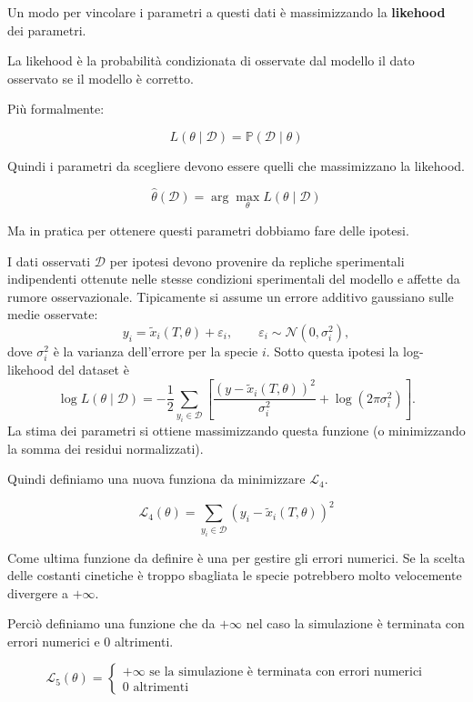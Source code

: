 Un modo per vincolare i parametri a questi dati è massimizzando la \textbf{likehood} dei parametri.

La likehood è la probabilità condizionata di osservate dal modello
il dato osservato se il modello è corretto.

Più formalmente:

\begin{equation}
    L(\theta \mid \mathcal{D}) = \mathbb{P}(\mathcal{D} \mid \theta)
\end{equation}

Quindi i parametri da scegliere devono essere quelli che massimizzano la likehood.

\begin{equation}
    \hat{\theta}(\mathcal{D}) = \arg\max_{\theta} L(\theta \mid \mathcal{D})
\end{equation}

Ma in pratica per ottenere questi parametri dobbiamo fare delle ipotesi.

I dati osservati $\mathcal{D}$ per ipotesi devono provenire da repliche sperimentali indipendenti ottenute nelle stesse condizioni sperimentali del modello e affette da rumore osservazionale. Tipicamente si assume un errore additivo gaussiano sulle medie osservate:
\[
y_i = \tilde{x}_i(T,\theta) + \varepsilon_i,\qquad \varepsilon_i \sim \mathcal{N}(0,\sigma_i^2),
\]
dove \(\sigma_i^2\) è la varianza dell'errore per la specie \(i\). Sotto questa ipotesi la log-likehood del dataset è
\[
\log L(\theta\mid\mathcal{D}) = -\frac{1}{2}\sum_{ y_i\in\mathcal{D}}\left[\frac{(y-\tilde{x}_i(T,\theta))^2}{\sigma_i^2} + \log(2\pi\sigma_i^2)\right].
\]
La stima dei parametri si ottiene massimizzando questa funzione (o minimizzando la somma dei residui normalizzati).

Quindi definiamo una nuova funziona da minimizzare $\mathcal{L}_4$.

\begin{equation}
    \mathcal{L}_4(\theta) = \sum_{y_i \in \mathcal{D}} (y_i - \tilde{x}_i(T,\theta))^2
\end{equation}

Come ultima funzione da definire è una per gestire gli errori numerici. Se la scelta delle costanti cinetiche è troppo sbagliata le specie potrebbero molto velocemente divergere a $+\infty$.

Perciò definiamo una funzione che da $+\infty$ nel caso la simulazione è terminata con errori numerici e 0 altrimenti.

\begin{equation}
    \mathcal{L}_5(\theta) = \begin{cases}
        +\infty \text{ se la simulazione è terminata con errori numerici}\\
        0 \text{ altrimenti}
    \end{cases}
\end{equation}

